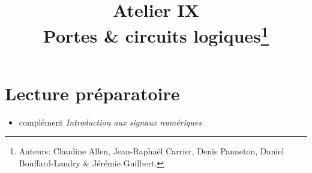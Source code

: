 \documentclass[canadien,12pt,oneside,letterpaper]{article}
\title{\textbf{Atelier IX}\\Portes \& circuits logiques\thanks{Auteurs: Claudine Allen, Jean-Raphaël Carrier, Denis Panneton, Daniel Bouffard-Landry \& Jérémie Guilbert.}}
\date{}
\begin{document}
\maketitle \vspace{-2cm}

%






\section{Lecture préparatoire}

\begin{itemize}
\item complément \textit{Introduction aux signaux numériques}
\end{itemize}
\end{document}

